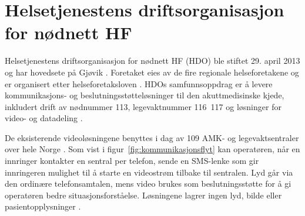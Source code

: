 




\section{Helsetjenestens driftsorganisasjon for nødnett HF}
\label{sec:hdo}
Helsetjenestens driftsorganisasjon for nødnett HF (HDO) ble stiftet 29. april 2013 og har hovedsete på Gjøvik \cite{hdo_om_oss}. Foretaket eies av de fire regionale helseforetakene og er organisert etter helseforetaksloven \cite{hdo_eierstyring}. HDOs samfunnsoppdrag er å levere kommunikasjons- og beslutningsstøtteløsninger til den akuttmedisinske kjede, inkludert drift av nødnummer 113, legevaktnummer 116~117 og løsninger for video- og datadeling \cite{hdo_om_oss}.

De eksisterende videoløsningene benyttes i dag av 109 AMK- og legevaktsentraler over hele Norge \cite{hdo_kravspec}. Som vist i figur~\ref{fig:kommunikasjonsflyt} kan operatøren, når en innringer kontakter en sentral per telefon, sende en SMS-lenke som gir innringeren mulighet til å starte en videostrøm tilbake til sentralen. Lyd går via den ordinære telefonsamtalen, mens video brukes som beslutningsstøtte for å gi operatøren bedre situasjonsforståelse. Løsningene lagrer ingen lyd, bilde eller pasientopplysninger \cite{hdo_produktark}.

